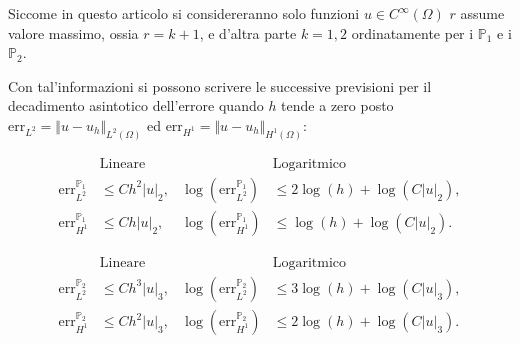 \documentclass{article}
\newcommand{\SpaziaturaMate}[3]{
    \setlength{\thinmuskip}{#1mu}
    \setlength{\medmuskip}{#2mu}
    \setlength{\thickmuskip}{#3mu}
}
\begin{document}
            {\SpaziaturaMate{1}{2}{3}
            Siccome in questo articolo si considereranno solo funzioni $u\in C^{\infty}(\Omega)$ $r$ assume valore massimo, ossia $r=k+1$, e d'altra parte $k=1,2$ ordinatamente per i $\mathbb P_1$ e i $\mathbb P_2$.
            
            Con tal'informazioni si possono scrivere le successive previsioni per il decadimento asintotico dell'errore quando $h$ tende a zero posto $\text{err}_{L^2}=\Vert u-u_h\Vert_{L^2(\Omega)}$ ed $\text{err}_{H^1}=\Vert u-u_h\Vert_{H^1(\Omega)}$:}

            \begin{description}[itemsep=0pt,       %
                                leftmargin=0pt,       %
                                labelindent=0.5cm] %
            
                \item[Errore dei $\mathbb{P}_1$]%
                    {\setlength{\thinmuskip}{1mu}
                    \setlength{\medmuskip}{2mu}
                    \setlength{\thickmuskip}{3mu}
                    \begin{align*}
                        &\text{Lineare}&&\text{Logaritmico}\tag*{}\\
                        \text{err}_{L^2}^{\mathbb{P}_1}&\le Ch^2\vert u\vert_2,&
                        \log(\text{err}_{L^2}^{\mathbb{P}_1})&\le 2\log(h)+\log(C\vert u\vert_2),
                        \\
                        \text{err}_{H^1}^{\mathbb{P}_1}&\le Ch\vert u\vert_2,&
                        \log(\text{err}_{H^1}^{\mathbb{P}_1})&\le \log(h)+\log(C\vert u\vert_2).
                    \end{align*}}
                    
                \item[Errore dei $\mathbb{P}_2$]%
                    {\setlength{\thinmuskip}{1mu}
                    \setlength{\medmuskip}{2mu}
                    \setlength{\thickmuskip}{3mu}
                    \begin{align*}
                        &\text{Lineare}&&\text{Logaritmico}\tag*{}\\
                        \text{err}_{L^2}^{\mathbb{P}_2}&\le Ch^3\vert u\vert_3,&
                        \log(\text{err}_{L^2}^{\mathbb{P}_2})&\le 3\log(h)+\log(C\vert u\vert_3),
                        \\
                        \text{err}_{H^1}^{\mathbb{P}_2}&\le Ch^2\vert u\vert_3,&
                        \log(\text{err}_{H^1}^{\mathbb{P}_2})&\le 2\log(h)+\log(C\vert u\vert_3).
                    \end{align*}}

            \end{description}
\end{document}
